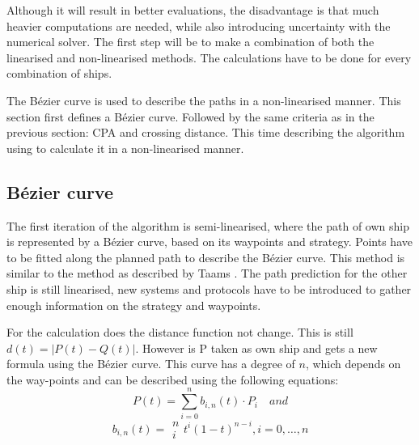 Although it will result in better evaluations, the disadvantage is that much heavier computations are needed, while also introducing uncertainty with the numerical solver. 
The first step will be to make a combination of both the linearised and non-linearised methods. The calculations have to be done for every combination of ships.

The Bézier curve is used to describe the paths in a non-linearised manner. This section first defines a Bézier curve. Followed by the same criteria as in the previous section: \acf{CPA} and crossing distance. This time describing the algorithm using to calculate it in a non-linearised manner.

\subsection{Bézier curve}
The first iteration of the algorithm is semi-linearised, where the path of own ship is represented by a Bézier curve, based on its waypoints and strategy. Points have to be fitted along the planned path to describe the Bézier curve. This method is similar to the method as described by Taams \cite{Taams2018}. The path prediction for the other ship is still linearised, new systems and protocols have to be introduced to gather enough information on the strategy and waypoints.

For the calculation does the distance function not change. This is still $
d(t) = |P(t) - Q(t)|$. However is P taken as own ship and gets a new formula using the Bézier curve. This curve has a degree of $n$, which depends on the way-points and can be described using the following equations:
\begin{equation}
P(t) = \sum\limits_{i=0}^n b_{i,n}(t) \cdot P_i \quad and
\end{equation}
\begin{equation}
b_{i,n}(t) = \begin{array}{c} n \\ i \end{array} t^i(1-t)^{n-i}, i = 0,\dots,n
\end{equation}

